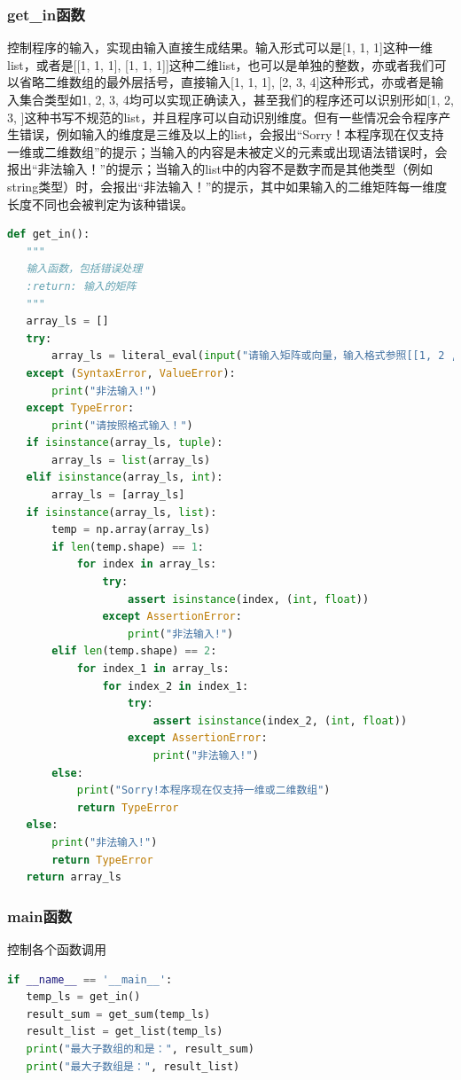 \documentclass{article}
\begin{document}
\subsubsection{get\_in函数}
控制程序的输入，实现由输入直接生成结果。输入形式可以是[1, 1, 1]这种一维list，或者是[[1, 1, 1], [1, 1, 1]]这种二维list，也可以是单独的整数，亦或者我们可以省略二维数组的最外层括号，直接输入[1, 1, 1], [2, 3, 4]这种形式，亦或者是输入集合类型如{1, 2, 3, 4}均可以实现正确读入，甚至我们的程序还可以识别形如[1, 2, 3, ]这种书写不规范的list，并且程序可以自动识别维度。\textcolor[rgb]{0,0.8,1}{但有一些情况会令程序产生错误，例如输入的维度是三维及以上的list，会报出“Sorry！本程序现在仅支持一维或二维数组”的提示；当输入的内容是未被定义的元素或出现语法错误时，会报出“非法输入！”的提示；当输入的list中的内容不是数字而是其他类型（例如string类型）时，会报出“非法输入！”的提示，其中如果输入的二维矩阵每一维度长度不同也会被判定为该种错误。}
\begin{lstlisting}[language = Python]
def get_in():
   """
   输入函数，包括错误处理
   :return: 输入的矩阵
   """
   array_ls = []
   try:
       array_ls = literal_eval(input("请输入矩阵或向量，输入格式参照[[1, 2 ,3], [4, 5, 6]]或[1, 2, 3, 4], [1, 2, 3, 4]:"))
   except (SyntaxError, ValueError):
       print("非法输入!")
   except TypeError:
       print("请按照格式输入！")
   if isinstance(array_ls, tuple):
       array_ls = list(array_ls)
   elif isinstance(array_ls, int):
       array_ls = [array_ls]
   if isinstance(array_ls, list):
       temp = np.array(array_ls)
       if len(temp.shape) == 1:
           for index in array_ls:
               try:
                   assert isinstance(index, (int, float))
               except AssertionError:
                   print("非法输入!")
       elif len(temp.shape) == 2:
           for index_1 in array_ls:
               for index_2 in index_1:
                   try:
                       assert isinstance(index_2, (int, float))
                   except AssertionError:
                       print("非法输入!")
       else:
           print("Sorry!本程序现在仅支持一维或二维数组")
           return TypeError
   else:
       print("非法输入!")
       return TypeError
   return array_ls
\end{lstlisting}
\subsubsection{main函数}
控制各个函数调用
\begin{lstlisting}[language = Python]
if __name__ == '__main__':
   temp_ls = get_in()
   result_sum = get_sum(temp_ls)
   result_list = get_list(temp_ls)
   print("最大子数组的和是：", result_sum)
   print("最大子数组是：", result_list)
\end{lstlisting}
\end{document}
